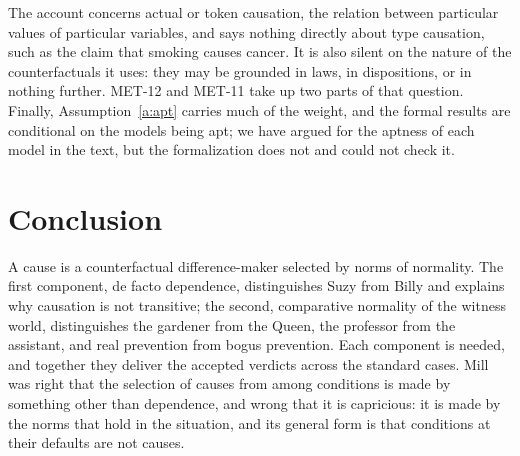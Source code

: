 \documentclass{situationist-preprint}
\begin{document}
The account concerns actual or token causation, the relation between particular values of particular variables, and says nothing directly about type causation, such as the claim that smoking causes cancer. It is also silent on the nature of the counterfactuals it uses: they may be grounded in laws, in dispositions, or in nothing further. MET-12 and MET-11 take up two parts of that question. Finally, Assumption~\ref{a:apt} carries much of the weight, and the formal results are conditional on the models being apt; we have argued for the aptness of each model in the text, but the formalization does not and could not check it.

\section{Conclusion}

A cause is a counterfactual difference-maker selected by norms of normality. The first component, de facto dependence, distinguishes Suzy from Billy and explains why causation is not transitive; the second, comparative normality of the witness world, distinguishes the gardener from the Queen, the professor from the assistant, and real prevention from bogus prevention. Each component is needed, and together they deliver the accepted verdicts across the standard cases. Mill was right that the selection of causes from among conditions is made by something other than dependence, and wrong that it is capricious: it is made by the norms that hold in the situation, and its general form is that conditions at their defaults are not causes.
\end{document}
